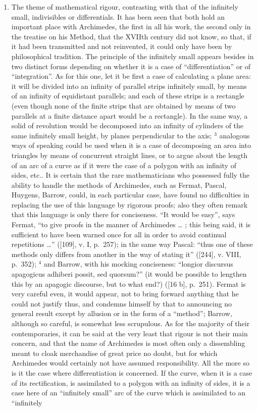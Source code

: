 \begin{enumerate}
\def\labelenumi{\Alph{enumi})}
\item
  The theme of mathematical rigour, contrasting with that of the infinitely small, indivisibles or differentials. It has been seen that both hold an important place with Archimedes, the first in all his work, the second only in the treatise on his Method, that the XVIIth century did not know, so that, if it had been transmitted and not reinvented, it could only have been by philosophical tradition. The principle of the infinitely small appears besides in two distinct forms depending on whether it is a case of ``differentiation'' or of ``integration''. As for this one, let it be first a case of calculating a plane area: it will be divided into an infinity of parallel strips infinitely small, by means of an infinity of equidistant parallels; and each of these strips is a rectangle (even though none of the finite strips that are obtained by means of two parallels at a finite distance apart would be a rectangle). In the same way, a solid of revolution would be decomposed into an infinity of cylinders of the same infinitely small height, by planes perpendicular to the axis; \(^{3}\) analogous ways of speaking could be used when it is a case of decomposing an area into triangles by means of concurrent straight lines, or to argue about the length of an arc of a curve as if it were the case of a polygon with an infinity of sides, etc.. It is certain that the rare mathematicians who possessed fully the ability to handle the methods of Archimedes, such as Fermat, Pascal, Huygens, Barrow, could, in each particular case, have found no difficulties in replacing the use of this language by rigorous proofs; also they often remark that this language is only there for conciseness. ``It would be easy'', says Fermat, ``to give proofs in the manner of Archimedes \ldots{} ; this being said, it is sufficient to have been warned once for all in order to avoid continual repetitions \ldots{}'' ({[}109{]}, v. I, p.~257); in the same way Pascal: ``thus one of these methods only differs from another in the way of stating it'' ({[}244{]}, v. VIII, p.~352); \(^{4}\) and Barrow, with his mocking conciseness: ``longior discursus apagogicus adhiberi possit, sed quorsum?'' (it would be possible to lengthen this by an apagogic discourse, but to what end?) ({[}16 b{]}, p.~251). Fermat is very careful even, it would appear, not to bring forward anything that he could not justify thus, and condemns himself by that to announcing no general result except by allusion or in the form of a ``method''; Barrow, although so careful, is somewhat less scrupulous. As for the majority of their contemporaries, it can be said at the very least that rigour is not their main concern, and that the name of Archimedes is most often only a dissembling meant to cloak merchandise of great price no doubt, but for which Archimedes would certainly not have assumed responsibility. All the more so is it the case where differentiation is concerned. If the curve, when it is a case of its rectification, is assimilated to a polygon with an infinity of sides, it is a case here of an ``infinitely small'' arc of the curve which is assimilated to an ``infinitely 
\end{enumerate}

